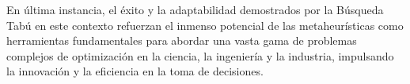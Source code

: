 \documentclass[12pt, a4paper]{article}
\begin{document}
En última instancia, el éxito y la adaptabilidad demostrados por la Búsqueda Tabú en este contexto refuerzan el inmenso potencial de las metaheurísticas como herramientas fundamentales para abordar una vasta gama de problemas complejos de optimización en la ciencia, la ingeniería y la industria, impulsando la innovación y la eficiencia en la toma de decisiones.

\clearpage



\end{document}
